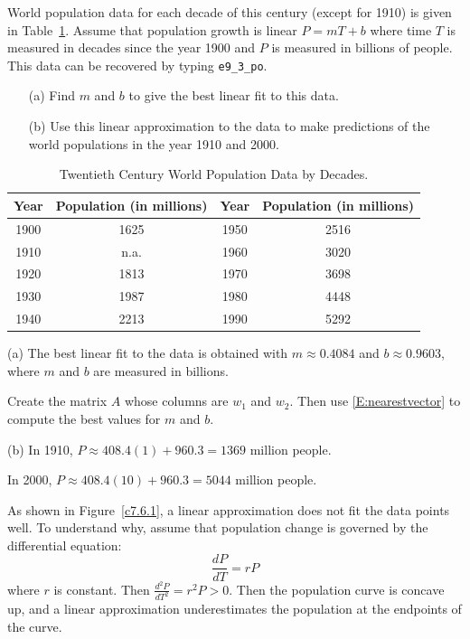 \documentclass{ximera}
\begin{document}
\begin{computerExercise} \label{c7.6.1}
World population data for each decade of this century (except for 1910)
is given in Table~\ref{T:popdata}.  Assume that population growth is linear
$P=mT+b$ where time $T$ is measured in decades since the year 1900 and $P$ is
measured in billions of people.  This data can be recovered by typing
{\tt e9\_3\_po}.
\begin{itemize}
\item[(a)]  Find $m$ and $b$ to give the best linear fit to this data.
\item[(b)]  Use this linear approximation to the data to make predictions
of the world populations in the year 1910 and 2000.
\end{itemize}
\begin{table}[htb]
\begin{center}
\begin{tabular}{|c|c||c|c|}
\hline
Year & Population (in millions) & Year & Population (in millions)\\
\hline
1900 & 1625 & 1950 & 2516  \\
1910 & n.a. & 1960 & 3020 \\
1920 & 1813 & 1970 & 3698 \\
1930 & 1987 & 1980 & 4448 \\
1940 & 2213 & 1990 & 5292 \\
\hline
\end{tabular}
\caption{Twentieth Century World Population Data by Decades.}
\label{T:popdata}
\end{center}
\end{table}


\begin{solution}

(a) \ans The best linear fit to the data is obtained with $m \approx
0.4084$ and $b \approx 0.9603$, where $m$ and $b$ are measured in
billions.

\soln Create the matrix $A$ whose columns are $w_1$ and $w_2$.  Then use
\eqref{E:nearestvector} to compute the best values for $m$ and $b$.

(b) \ans In 1910, $P \approx 408.4(1) + 960.3 = 1369$ million people.

\para In 2000, $P \approx 408.4(10) + 960.3 = 5044$ million people.


\soln As shown in Figure~\ref{c7.6.1}, a linear approximation does not
fit the data points well.  To understand why, assume that population
change is governed by the differential equation:
\[
\frac{dP}{dT} = rP
\]
where $r$ is constant.  Then $\frac{d^2P}{dT^2} = r^2P > 0$.
Then the population curve is concave up, and a linear approximation
underestimates the population at the endpoints of the curve.


\end{solution}
\end{computerExercise}
\end{document}
